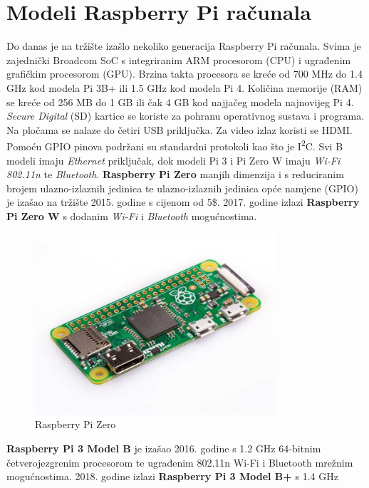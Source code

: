 \documentclass[11pt]{article}
\begin{document}
\section{Modeli Raspberry Pi računala}
Do danas je na tržište izašlo nekoliko generacija Raspberry Pi računala.
Svima je zajednički Broadcom SoC s integriranim ARM procesorom (CPU) i
 ugrađenim grafičkim procesorom (GPU).
Brzina takta procesora se kreće od 700 MHz do 1.4 GHz kod modela Pi 3B+ ili
 1.5 GHz kod modela Pi 4. Količina memorije (RAM) se kreće od 256 MB do 1 GB
 ili čak 4 GB kod najjačeg modela najnovijeg Pi 4. \textit{Secure Digital} (SD)
 kartice se koriste za pohranu operativnog sustava i programa. Na pločama se
 nalaze do četiri USB priključka. Za video izlaz koristi se HDMI.
 Pomoću GPIO pinova podržani su standardni protokoli kao što je
 I\textsuperscript{2}C.
Svi B modeli imaju \textit{Ethernet} priključak, dok modeli Pi 3 i Pi Zero W
imaju \textit{Wi-Fi 802.11n} te \textit{Bluetooth}.
\newline
\newline
\textbf{Raspberry Pi Zero} manjih dimenzija i s reduciranim brojem
 ulazno-izlaznih jedinica te ulazno-izlaznih jedinica opće namjene (GPIO) je
 izašao na tržište 2015. godine s cijenom od 5\$. 2017. godine izlazi
 \textbf{Raspberry Pi Zero W} s dodanim \textit{Wi-Fi} i \textit{Bluetooth}
 mogućnostima.
\begin{figure}[h!]
\centering
\includegraphics[width=0.8\textwidth]{rpi-zero.jpg}
\captionsetup{justification=centering}
\caption{Raspberry Pi Zero}
\end{figure}
\newline
\textbf{Raspberry Pi 3 Model B} je izašao 2016. godine s 1.2 GHz 64-bitnim
 četverojezgrenim procesorom te ugrađenim 802.11n Wi-Fi i Bluetooth mrežnim
 mogućnostima. 2018. godine izlazi \textbf{Raspberry Pi 3 Model B+} s 1.4 GHz
\end{document}
